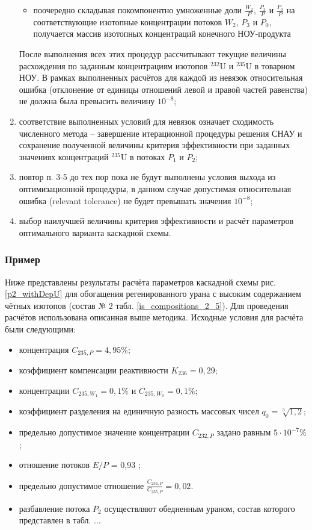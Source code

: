 \begin{enumerate}
\begin{itemize}
        \item поочередно складывая покомпонентно умноженные доли $\frac{W_{2}}{P}$, $\frac{P_{3}}{P}$ и $\frac{P_{0}}{P}$ на соответствующие изотопные концентрации потоков $W_2$, $P_3$ и $P_0$, получается массив изотопных концентраций конечного НОУ-продукта
        \end{itemize}
    После выполнения всех этих процедур рассчитывают текущие величины расхождения по заданным концентрациям изотопов $^{232}$U и $^{235}$U в товарном НОУ. В рамках выполненных расчётов для каждой из невязок относительная ошибка (отклонение от единицы отношений левой и правой частей равенства) не должна была превысить величину $10^{-8}$;
    \item соответствие выполненных условий для невязок означает сходимость численного метода -- завершение итерационной процедуры решения СНАУ и сохранение полученной величины критерия эффективности при заданных значениях концентраций $^{235}$U в потоках $P_1$ и $P_2$;
    \item повтор п. 3-5 до тех пор пока не будут выполнены условия выхода из оптимизационной процедуры, в данном случае допустимая относительная ошибка (relevant tolerance) не будет превышать значения $10^{-8}$;
    \item выбор наилучшей величины критерия эффективности и расчёт параметров оптимального варианта каскадной схемы.
\end{enumerate}


\subsubsection{Пример}

Ниже представлены результаты расчёта параметров каскадной схемы рис. \ref{p2_withDepU} для обогащения регенированного урана с высоким содержанием чётных изотопов (состав № 2 табл. \ref{is_compositions_2_5}). Для проведения расчётов использована описанная выше методика. Исходные условия для расчёта были следующими:

\begin{itemize}
    \item концентрация $C_{235,{P}} = {4,95\%}$; 
    \item коэффициент компенсации реактивности $K_{236}=0,29$;
    \item концентрации $C_{235,{W_1}} = 0,1\%$ и $C_{235,{W_0}} = 0,1\%$;
    \item коэффициент разделения на единичную разность массовых чисел $q_{0} = \sqrt[3]{1,2}$;
    \item предельно допустимое значение концентрации $C_{232,{P}}$ задано равным $5\cdot10^{-7} \%$;
    \item отношение потоков $E/P$ = 0,93 ;
    \item предельно допустимое отношение $\frac{C_{234,{P}}}{C_{235,{P}}} = 0,02$.
    \item разбавление потока $P_2$ осуществляют обедненным ураном, состав которого представлен в табл. ...
\end{itemize}

